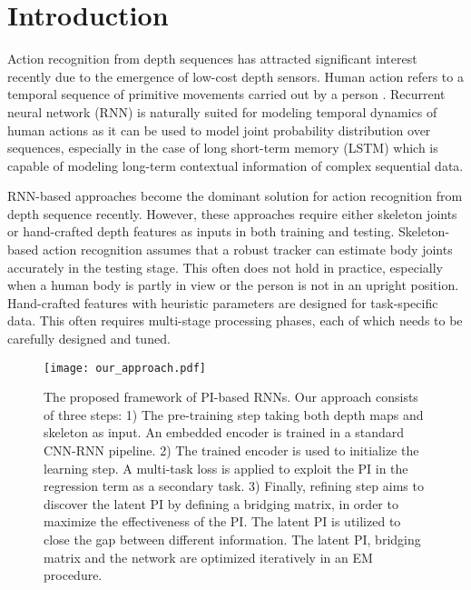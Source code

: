 \documentclass[10pt,twocolumn,letterpaper]{article}
\begin{document}
\section{Introduction}
Action recognition from depth sequences \cite{Yang_tpami_2016,Omar_cvpr_2013,Jiajia_iccv_2013,Vieira_2012,wang2015cnn} has attracted significant interest recently due to the emergence of low-cost depth sensors. Human action refers to a temporal sequence of primitive movements carried out by a person \cite{action_1992}. Recurrent neural network (RNN) \cite{Graves_2012_book} is naturally suited for modeling temporal dynamics of human actions as it can be used to model joint probability distribution over sequences, especially in the case of long short-term memory (LSTM) \cite{Hochreiter_1997} which is capable of modeling long-term contextual information of complex sequential data. 

RNN-based approaches become the dominant solution \cite{wentao_2016,Veeriah_2015_ICCV,Yong_cvpr_2015,Liu2016} for action recognition from depth sequence recently. However, these approaches require either skeleton joints \cite{wentao_2016,Yong_cvpr_2015,Piotr_2016} or hand-crafted depth features \cite{Veeriah_2015_ICCV} as inputs in both training and testing. Skeleton-based action recognition assumes that a robust tracker can estimate body joints accurately in the testing stage. This often does not hold in practice, especially when a human body is partly in view or the person is not in an upright position. Hand-crafted features with heuristic parameters are designed for task-specific data. This often requires multi-stage processing phases, each of which needs to be carefully designed and tuned.

\begin{figure*}[t]
\centering
   \texttt{[image: our\_approach.pdf]}
 
\caption{The proposed framework of PI-based RNNs. Our approach consists of three steps: 1) The pre-training step taking both depth maps and skeleton as input. An embedded encoder is trained in a standard CNN-RNN pipeline. 2) The trained encoder is used to initialize the learning step. A multi-task loss is applied to exploit the PI in the regression term as a secondary task. 3) Finally, refining step aims to discover the latent PI by defining a bridging matrix, in order to maximize the effectiveness of the PI. The latent PI is utilized to close the gap between different information. The latent PI, bridging matrix and the network are optimized iteratively in an EM procedure.}
\label{fig:our_model}
\end{figure*}
\end{document}
